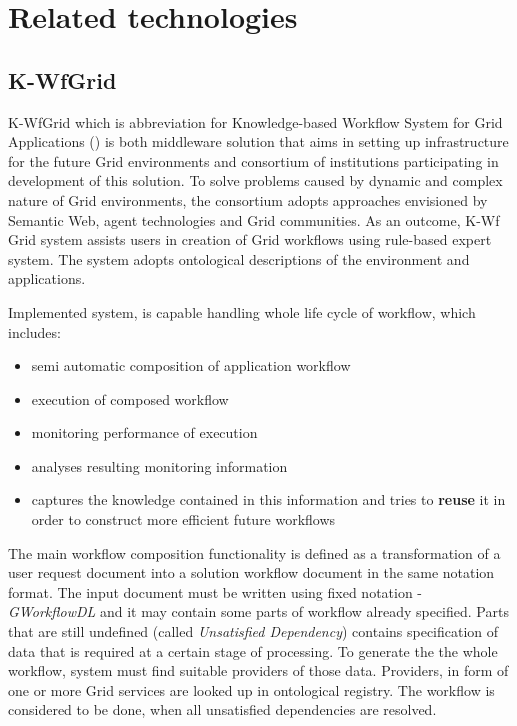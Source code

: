 %
 
 
\section{Related technologies}




\subsection{K-WfGrid}
\label{ssec:kwfgrid}

K-WfGrid which is abbreviation for Knowledge-based Workflow System for Grid Applications (\cite{KWfGrid1, flow-cgw04, wct-kwf-book-07}) is both
middleware solution that aims in setting up infrastructure for the future Grid environments and consortium of institutions participating in
development of this solution. To solve problems caused by dynamic and complex nature of Grid environments, the consortium adopts approaches
envisioned by Semantic Web, agent technologies and Grid communities. As an outcome, K-Wf Grid system assists users in creation of Grid
workflows using rule-based expert system. The system adopts ontological descriptions of the environment and applications. 

Implemented system, is capable handling whole life cycle of workflow, which includes: 

\begin{itemize}
  \item{semi automatic composition of application workflow}
  \item{execution of composed workflow}
  \item{monitoring performance of execution}
  \item{analyses resulting monitoring information}
  \item{captures the knowledge contained in this information and tries to {\bf reuse} it in order to construct more efficient future workflows}
\end{itemize}

The main workflow composition functionality is defined as a transformation of a user request document into a solution workflow document in the
same notation format. The input document must be written using fixed notation - \emph{GWorkflowDL} and it may contain some parts of workflow
already specified. Parts that are still undefined (called \emph{Unsatisfied Dependency}) contains specification of data that is required at a certain
stage of processing. To generate the the whole workflow, system must find suitable providers of those data. Providers, in form of one or more Grid
services are looked up in ontological registry. The workflow is considered to be done, when all unsatisfied dependencies are resolved.

